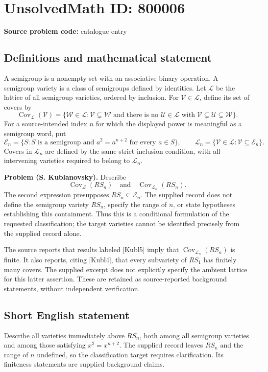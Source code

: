 \documentclass[11pt]{article}
\begin{document}
\section*{UnsolvedMath ID: 800006}
\textbf{Source problem code:} catalogue entry
\subsection{Definitions and mathematical statement}
A semigroup is a nonempty set with an associative binary operation. A semigroup variety is a class of semigroups defined by identities. Let \(\mathcal L\) be the lattice of all semigroup varieties, ordered by inclusion. For \(\mathcal V\in\mathcal L\), define its set of covers by
\[
\operatorname{Cov}_{\mathcal L}(\mathcal V)=\{\mathcal W\in\mathcal L:\mathcal V\subsetneq\mathcal W\text{ and there is no }\mathcal U\in\mathcal L\text{ with }\mathcal V\subsetneq\mathcal U\subsetneq\mathcal W\}.
\]
For a source-intended index \(n\) for which the displayed power is meaningful as a semigroup word, put
\[
\mathcal E_n=\{S:S\text{ is a semigroup and }a^2=a^{n+2}\text{ for every }a\in S\},\qquad
\mathcal L_n=\{\mathcal V\in\mathcal L:\mathcal V\subseteq\mathcal E_n\}.
\]
Covers in \(\mathcal L_n\) are defined by the same strict-inclusion condition, with all intervening varieties required to belong to \(\mathcal L_n\).

\textbf{Problem (S. Kublanovsky).} Describe
\[
\operatorname{Cov}_{\mathcal L}(RS_n)
\quad\text{and}\quad
\operatorname{Cov}_{\mathcal L_n}(RS_n).
\]
The second expression presupposes \(RS_n\subseteq\mathcal E_n\). The supplied record does not define the semigroup variety \(RS_n\), specify the range of \(n\), or state hypotheses establishing this containment. Thus this is a conditional formulation of the requested classification; the target varieties cannot be identified precisely from the supplied record alone.

The source reports that results labeled [Kubl5] imply that \(\operatorname{Cov}_{\mathcal L_n}(RS_n)\) is finite. It also reports, citing [Kubl4], that every subvariety of \(RS_1\) has finitely many covers. The supplied excerpt does not explicitly specify the ambient lattice for this latter assertion. These are retained as source-reported background statements, without independent verification.
\subsection{Short English statement}
Describe all varieties immediately above \(RS_n\), both among all semigroup varieties and among those satisfying \(x^2=x^{n+2}\). The supplied record leaves \(RS_n\) and the range of \(n\) undefined, so the classification target requires clarification. Its finiteness statements are supplied background claims.
\end{document}
